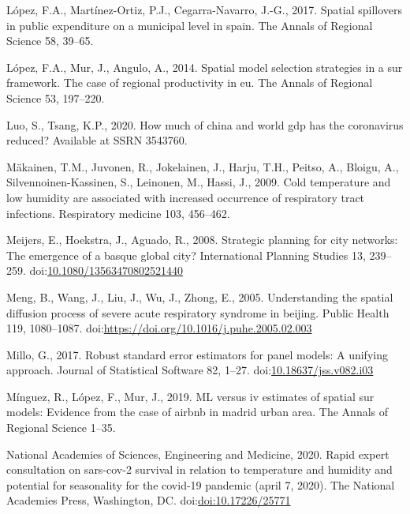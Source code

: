 \documentclass[]{elsarticle} %
\begin{document}
\leavevmode\hypertarget{ref-Lopez2017spatial}{}%
López, F.A., Martínez-Ortiz, P.J., Cegarra-Navarro, J.-G., 2017. Spatial
spillovers in public expenditure on a municipal level in spain. The
Annals of Regional Science 58, 39--65.

\leavevmode\hypertarget{ref-Lopez2014spatial}{}%
López, F.A., Mur, J., Angulo, A., 2014. Spatial model selection
strategies in a sur framework. The case of regional productivity in eu.
The Annals of Regional Science 53, 197--220.

\leavevmode\hypertarget{ref-Luo2020how}{}%
Luo, S., Tsang, K.P., 2020. How much of china and world gdp has the
coronavirus reduced? Available at SSRN 3543760.

\leavevmode\hypertarget{ref-Makinen2009cold}{}%
Mäkainen, T.M., Juvonen, R., Jokelainen, J., Harju, T.H., Peitso, A.,
Bloigu, A., Silvennoinen-Kassinen, S., Leinonen, M., Hassi, J., 2009.
Cold temperature and low humidity are associated with increased
occurrence of respiratory tract infections. Respiratory medicine 103,
456--462.

\leavevmode\hypertarget{ref-Meijers2008strategic}{}%
Meijers, E., Hoekstra, J., Aguado, R., 2008. Strategic planning for city
networks: The emergence of a basque global city? International Planning
Studies 13, 239--259.
doi:\href{https://doi.org/10.1080/13563470802521440}{10.1080/13563470802521440}

\leavevmode\hypertarget{ref-Meng2005understanding}{}%
Meng, B., Wang, J., Liu, J., Wu, J., Zhong, E., 2005. Understanding the
spatial diffusion process of severe acute respiratory syndrome in
beijing. Public Health 119, 1080--1087.
doi:\href{https://doi.org/https://doi.org/10.1016/j.puhe.2005.02.003}{https://doi.org/10.1016/j.puhe.2005.02.003}

\leavevmode\hypertarget{ref-Millo2017robust}{}%
Millo, G., 2017. Robust standard error estimators for panel models: A
unifying approach. Journal of Statistical Software 82, 1--27.
doi:\href{https://doi.org/10.18637/jss.v082.i03}{10.18637/jss.v082.i03}

\leavevmode\hypertarget{ref-Minguez2019}{}%
Mínguez, R., López, F., Mur, J., 2019. ML versus iv estimates of spatial
sur models: Evidence from the case of airbnb in madrid urban area. The
Annals of Regional Science 1--35.

\leavevmode\hypertarget{ref-National2020rapid}{}%
National Academies of Sciences, Engineering and Medicine, 2020. Rapid
expert consultation on sars-cov-2 survival in relation to temperature
and humidity and potential for seasonality for the covid-19 pandemic
(april 7, 2020). The National Academies Press, Washington, DC.
doi:\href{https://doi.org/doi:10.17226/25771}{doi:10.17226/25771}
\end{document}
